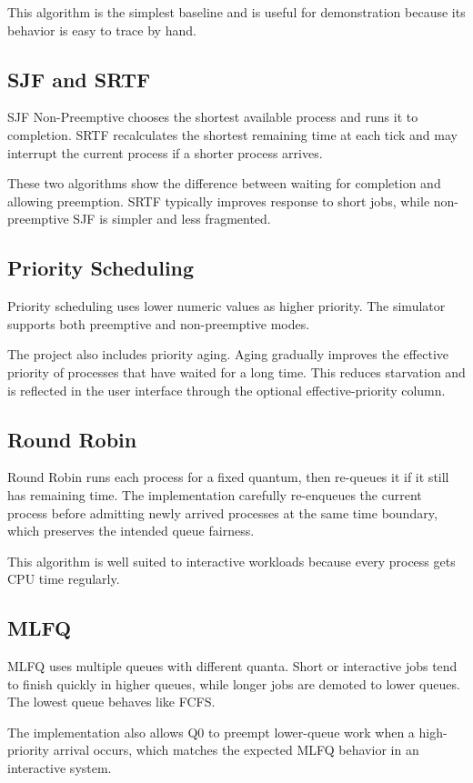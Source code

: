 \documentclass[12pt]{article}
\begin{document}
This algorithm is the simplest baseline and is useful for demonstration because its behavior is easy to trace by hand.

\subsection{SJF and SRTF}
SJF Non-Preemptive chooses the shortest available process and runs it to completion. SRTF recalculates the shortest remaining time at each tick and may interrupt the current process if a shorter process arrives.

These two algorithms show the difference between waiting for completion and allowing preemption. SRTF typically improves response to short jobs, while non-preemptive SJF is simpler and less fragmented.

\subsection{Priority Scheduling}
Priority scheduling uses lower numeric values as higher priority. The simulator supports both preemptive and non-preemptive modes.

The project also includes priority aging. Aging gradually improves the effective priority of processes that have waited for a long time. This reduces starvation and is reflected in the user interface through the optional effective-priority column.

\subsection{Round Robin}
Round Robin runs each process for a fixed quantum, then re-queues it if it still has remaining time. The implementation carefully re-enqueues the current process before admitting newly arrived processes at the same time boundary, which preserves the intended queue fairness.

This algorithm is well suited to interactive workloads because every process gets CPU time regularly.

\subsection{MLFQ}
MLFQ uses multiple queues with different quanta. Short or interactive jobs tend to finish quickly in higher queues, while longer jobs are demoted to lower queues. The lowest queue behaves like FCFS.

The implementation also allows Q0 to preempt lower-queue work when a high-priority arrival occurs, which matches the expected MLFQ behavior in an interactive system.
\end{document}
